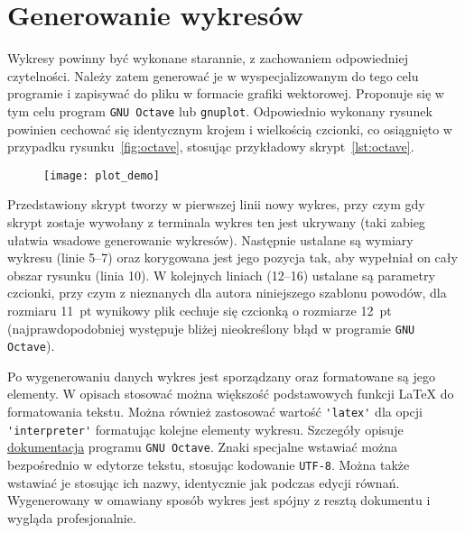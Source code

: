\chapter{Generowanie wykresów}

Wykresy powinny być wykonane starannie, z zachowaniem odpowiedniej czytelności. Należy zatem generować je w wyspecjalizowanym do tego celu programie i zapisywać do pliku w formacie grafiki wektorowej. Proponuje się w tym celu program \verb|GNU Octave| lub \verb|gnuplot|. Odpowiednio wykonany rysunek powinien cechować się identycznym krojem i wielkością czcionki, co osiągnięto w przypadku rysunku~\ref{fig:octave}, stosując przykładowy skrypt~\ref{lst:octave}.

\begin{figure}[htb!]
\centering
\texttt{[image: plot\_demo]}
\end{figure}

Przedstawiony skrypt tworzy w pierwszej linii nowy wykres, przy czym gdy skrypt zostaje wywołany z terminala wykres ten jest ukrywany (taki zabieg ułatwia wsadowe generowanie wykresów). Następnie ustalane są wymiary wykresu (linie 5--7) oraz korygowana jest jego pozycja tak, aby wypełniał on cały obszar rysunku (linia 10). W kolejnych liniach (12--16) ustalane są parametry czcionki, przy czym z nieznanych dla autora niniejszego szablonu powodów, dla rozmiaru \qty{11}{pt} wynikowy plik cechuje się czcionką o rozmiarze \qty{12}{pt} (najprawdopodobniej występuje bliżej nieokreślony błąd w programie \verb|GNU Octave|).

Po wygenerowaniu danych wykres jest sporządzany oraz formatowane są jego elementy. W opisach stosować można większość podstawowych funkcji \LaTeX{} do formatowania tekstu. Można również zastosować wartość \verb|'latex'| dla opcji \verb|'interpreter'| formatując kolejne elementy wykresu. Szczegóły opisuje \href{https://docs.octave.org/latest}{dokumentacja} programu \verb|GNU Octave|. Znaki specjalne wstawiać można bezpośrednio w edytorze tekstu, stosując kodowanie \verb|UTF-8|. Można także wstawiać je stosując ich nazwy, identycznie jak podczas edycji równań. Wygenerowany w omawiany sposób wykres jest spójny z resztą dokumentu i wygląda profesjonalnie.

\begin{listing}[hbt!]
\inputminted[linenos, breaklines]{octave}{skrypty/plot_demo.m}
\end{listing}
